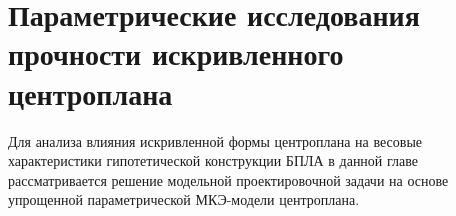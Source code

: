 \chapter{Параметрические исследования прочности искривленного центроплана}
\label{chap:Kesson}

Для анализа влияния искривленной формы центроплана на весовые характеристики гипотетической конструкции БПЛА в данной главе рассматривается решение модельной проектировочной задачи на основе упрощенной параметрической МКЭ-модели центроплана. 

%
